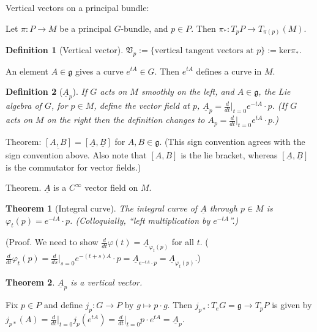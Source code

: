 \documentclass{article}
\theoremstyle{mystyle}
\newtheorem*{definition}{Definition}%
\newtheorem*{theorem*}{Theorem}
\theoremstyle{remark}
\numberwithin{equation}{section}
\begin{document}
Vertical vectors on a principal bundle:

Let $\pi\colon P\rightarrow M$ be a principal $G$-bundle, and $p\in P$. Then $\pi_*\colon T_pP\rightarrow T_{\pi(p)}(M)$. 

\begin{definition}[Vertical vector] $\mathfrak{V}_p := \{\text{vertical tangent vectors at }p\} := \mathrm{ker} \pi_*$.
\end{definition}

An element $A \in \mathfrak{g}$ gives a curve $e^{tA} \in G$. Then $e^{tA}$ defines a curve in $M$. 

\begin{definition}[$\underline{A}_p$] If $G$ acts on $M$ smoothly on the left, and $A\in \mathfrak{g}$, the Lie algebra of $G$, for $p\in M$, define the vector field at $p$, $\underline{A}_p = \frac{d}{dt}\Big|_{t=0} e^{-tA}\cdot p$. (If $G$ acts on $M$ on the right then the definition changes to $A_p = \frac{d}{dt}\Big|_{t=0} e^{tA}\cdot p$.)
\end{definition}

Theorem: $\underline{[A,B]}  =  [\underline{A},\underline{B}]$ for $A,B \in \mathfrak{g}$. (This sign convention agrees with the sign convention above. Also note that $[A,B]$ is the lie bracket, whereas  $[\underline{A},\underline{B}]$ is the commutator for vector fields.) 

Theorem. $\underline{A}$ is a $C^\infty$ vector field on $M$.

\begin{theorem*}[Integral curve] The \emph{integral curve} of $\underline{A}$ through $p\in M$ is $\varphi_t(p) = e^{-tA}\cdot p$. (Colloquially, ``left multiplication by $e^{-tA}$''.)
\end{theorem*}

(Proof. We need to show $\frac{d}{dt} \varphi(t) = \underline{A}_{\varphi_t(p)}$ for all $t$. ($\frac{d}{dt} \varphi_t(p) = \frac{d}{ds}|_{s=0} e^{-(t+s)A}\cdot p = \underline{A}_{e^{-tA}\cdot p} = \underline{A}_{\varphi_t(p)}$.)

\begin{theorem*}$\underline{A}_p$ is a vertical vector.
\end{theorem*} 

Fix $p\in P$ and define $j_p\colon G\rightarrow P$ by $g\mapsto p\cdot g$. Then $j_{p*}\colon T_eG = \mathfrak{g}\rightarrow T_pP$ is given by $j_{p*}(A) = 
\frac{d}{dt}\Big|_{t=0}j_p(e^{tA}) = \frac{d}{dt}\Big|_{t=0}p\cdot e^{tA} = \underline{A}_p$. 
\end{document}
